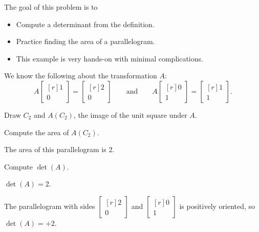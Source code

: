 \documentclass{problemset}
\newcommand{\mat}[1]{\begin{bmatrix*}[r]#1\end{bmatrix*}}
\begin{document}
	\question
	\begin{annotation}
		\begin{goals}

			The goal of this problem is to
			\begin{itemize}
				\item Compute a determinant from the definition.
				\item Practice finding the area of a parallelogram.
			\end{itemize}
		\end{goals}

		\begin{notes}
			\begin{itemize}
				\item This example is very hands-on with minimal complications.
			\end{itemize}
		\end{notes}
	\end{annotation}
	We know the following about the transformation $A$:
	\[
		A\mat{1\\0}=\mat{2\\0}\qquad\text{and}\qquad A\mat{0\\1}=\mat{1\\1}.
	\]
	\begin{parts}
		\item Draw $C_2$ and $A(C_2)$, the image of the unit square
			under $A$.
			\begin{solution}
			\end{solution}
		\item Compute the area of $A(C_2)$.
			\begin{solution}[inline]
				The area of this parallelogram is 2.
			\end{solution}
		\item Compute $\det(A)$.
			\begin{solution}
				$\det(A)=2$.

				The parallelogram with sides $\mat{2\\0}$ and $\mat{0\\1}$ is
				positively oriented, so $\det(A)=+2$.
			\end{solution}
	\end{parts}
\end{document}
